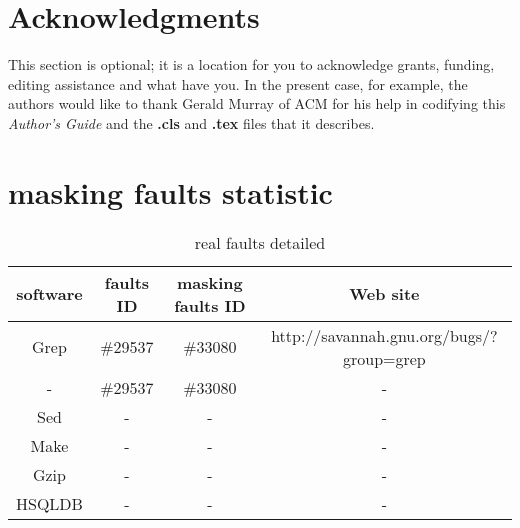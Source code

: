 \documentclass{sig-alternate}
\begin{document}

\section{Acknowledgments}
This section is optional; it is a location for you
to acknowledge grants, funding, editing assistance and
what have you.  In the present case, for example, the
authors would like to thank Gerald Murray of ACM for
his help in codifying this \textit{Author's Guide}
and the \textbf{.cls} and \textbf{.tex} files that it describes.

%

%
%
%
\appendix
\section{masking faults statistic}
\begin{table*}\renewcommand{\arraystretch}{1.3}
\caption{real faults detailed}
\label{masking effect detail}
\begin{tabular}{c|c|c|c} \hline
software & faults ID & masking faults ID & Web site\\ \hline
Grep & \#29537 &  \#33080  & http://savannah.gnu.org/bugs/?group=grep\\ \hline
- & \#29537 &  \#33080  & -\\ \hline
Sed & - & -  & - \\ \hline
Make & - &  - &-\\ \hline
Gzip &- &  - &-\\ \hline
HSQLDB &- & - &-\\
\hline\end{tabular}
\end{table*}
\end{document}
